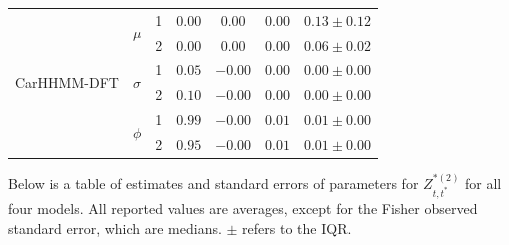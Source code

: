 \documentclass[12pt]{TD-CJS}
\begin{document}
{\begin{tabular}{ccccccc}
\multirow{6}{*}{CarHHMM-DFT}& \multirow{2}{*}{$\mu$}        & 1                             & $0.00$                         & $0.00$                     & $0.00$                             & $0.13 \pm 0.12$                             \\
                           &                               & 2                             & $0.00$                         & $0.00$                     & $0.00$                             & $0.06 \pm 0.02$                             \\
                           & \multirow{2}{*}{$\sigma$}     & 1                             & $0.05$                         & $-0.00$                     & $0.00$                             & $0.00 \pm 0.00$                             \\
                           &                               & 2                             & $0.10$                         & $-0.00$                     & $0.00$                             & $0.00 \pm 0.00$                             \\ 
                           & \multirow{2}{*}{$\phi$}       & 1                             & $0.99$                         & $-0.00$                     & $0.01$                             & $0.01 \pm 0.00$                             \\
                           &                               & 2                             & $0.95$                         & $-0.00$                     & $0.01$                             & $0.01 \pm 0.00$                             \\ \hline
\end{tabular}
}


\newpage
Below is a table of estimates and standard errors of parameters for $Z^{*(2)}_{t,t^*}$ for all four models. All reported values are averages, except for the Fisher observed standard error, which are medians. $\pm$ refers to the IQR.
\vspace{1cm}
\end{document}
